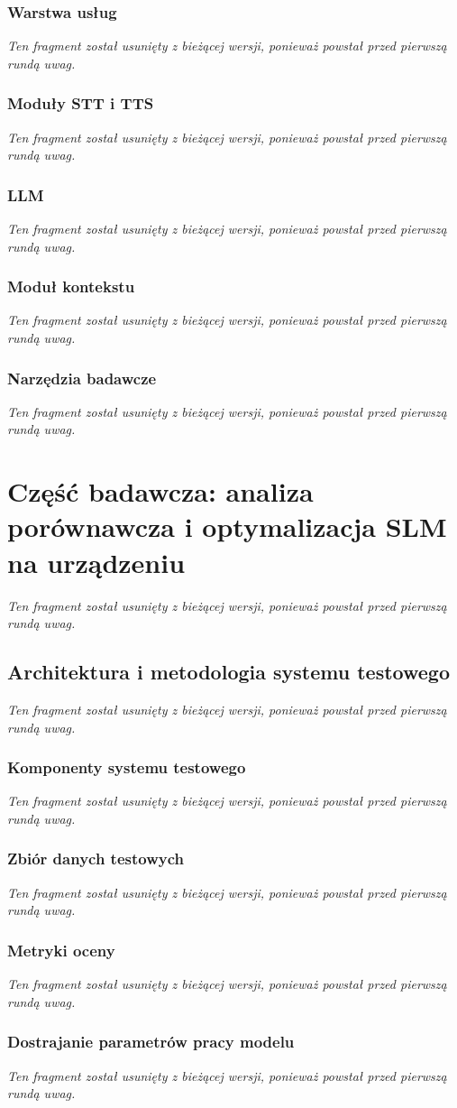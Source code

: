 \documentclass[
    a4paper,
    left=25mm,
    right=25mm,
    top=25mm,
    bottom=25mm,
    bindingoffset=5mm,
    nohyphenation=false
]{src/wut-thesis}
\newcommand{\nieredagowane}{%
\textit{Ten fragment został usunięty z bieżącej wersji, ponieważ powstał przed pierwszą rundą uwag.}%
}
\begin{document}
\subsubsection{Warstwa usług}
\nieredagowane

\subsubsection{Moduły STT i TTS}
\nieredagowane

\subsubsection{LLM}
\nieredagowane

\subsubsection{Moduł kontekstu}
\nieredagowane

\subsubsection{Narzędzia badawcze}
\nieredagowane

\newpage
\section{Część badawcza: analiza porównawcza i optymalizacja SLM na urządzeniu}
\label{sec:modele}
\nieredagowane

\subsection{Architektura i metodologia systemu testowego}
\nieredagowane

\subsubsection{Komponenty systemu testowego}
\nieredagowane

\subsubsection{Zbiór danych testowych}
\nieredagowane

\subsubsection{Metryki oceny}
\nieredagowane

\subsubsection{Dostrajanie parametrów pracy modelu}
\nieredagowane
\end{document}
